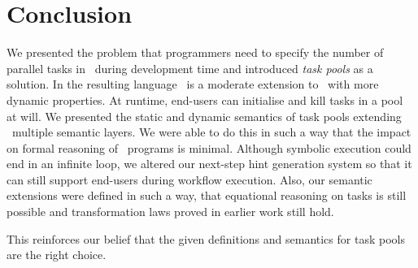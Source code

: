 
\section{Conclusion}
\label{sec:conclusion}

We presented the problem that programmers need to specify the number of parallel tasks in \TOPHAT\ during development time
and introduced \emph{task pools} as a solution.
In the resulting language \DYNTOPHAT\ is a moderate extension to \TOPHAT\ with more dynamic properties.
At runtime, end-users can initialise and kill tasks in a pool at will.
We presented the static and dynamic semantics of task pools extending \TOPHAT\ multiple semantic layers.
We were able to do this in such a way that the impact on formal reasoning of \TOPHAT\ programs is minimal.
Although symbolic execution could end in an infinite loop,
we altered our next-step hint generation system so that it can still support end-users during workflow execution.
Also, our semantic extensions were defined in such a way, that equational reasoning on tasks is still possible
and transformation laws proved in earlier work still hold.

This reinforces our belief that the given definitions and semantics for task pools are the right choice.


